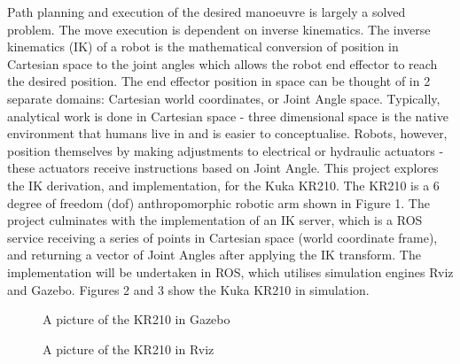 \documentclass[a4paper]{article}
\begin{document}
Path planning and execution of the desired manoeuvre is largely a solved problem. The move execution is dependent on inverse kinematics. The inverse kinematics (IK) of a robot is the mathematical conversion of position in Cartesian space to the joint angles which allows the robot end effector to reach the desired position. The end effector position in space can be thought of in 2 separate domains: Cartesian world coordinates, or Joint Angle space. Typically, analytical work is done in Cartesian space - three dimensional space is the native environment that humans live in and is easier to conceptualise. Robots, however, position themselves by making adjustments to electrical or hydraulic actuators - these actuators receive instructions based on Joint Angle. This project explores the IK derivation, and implementation, for the Kuka KR210. The KR210 is a 6 degree of freedom (dof) anthropomorphic robotic arm shown in Figure 1. The project culminates with the implementation of an IK server, which is a ROS service receiving a series of points in Cartesian space (world coordinate frame), and returning a vector of Joint Angles after applying the IK transform. The implementation will be undertaken in ROS, which utilises simulation engines Rviz and Gazebo. Figures 2 and 3 show the Kuka KR210 in simulation.

\begin{figure}[h]
\centering
\begin{minipage}[t]{0.45\linewidth}
\centering
{}
\caption{A picture of the KR210 in Gazebo}
\end{minipage}
\hspace{1cm}
\begin{minipage}[t]{0.45\linewidth}
\centering
{}
\caption{A picture of the KR210 in Rviz}
\end{minipage}
\end{figure}
\end{document}
